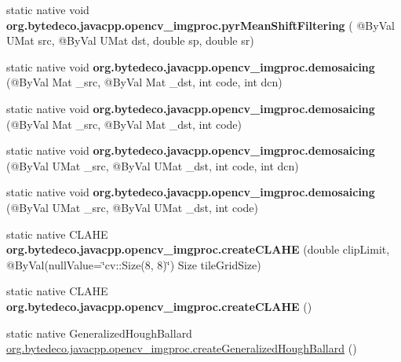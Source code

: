 \begin{DoxyCompactItemize}
\item 
\mbox{\label{group__imgproc__filter_ga8e24348e55b95d864865d7c1903e7555}} 
static native void {\bfseries org.\+bytedeco.\+javacpp.\+opencv\+\_\+imgproc.\+pyr\+Mean\+Shift\+Filtering} ( @By\+Val U\+Mat src, @By\+Val U\+Mat dst, double sp, double sr)
\item 
\mbox{\label{group__imgproc__filter_ga43b092e00aaf90fda456fb6613004018}} 
static native void {\bfseries org.\+bytedeco.\+javacpp.\+opencv\+\_\+imgproc.\+demosaicing} (@By\+Val Mat \+\_\+src, @By\+Val Mat \+\_\+dst, int code, int dcn)
\item 
\mbox{\label{group__imgproc__filter_ga50b3861706458e84ba09dc916db23498}} 
static native void {\bfseries org.\+bytedeco.\+javacpp.\+opencv\+\_\+imgproc.\+demosaicing} (@By\+Val Mat \+\_\+src, @By\+Val Mat \+\_\+dst, int code)
\item 
\mbox{\label{group__imgproc__filter_gac1393006c09ce6896767536b0c184d21}} 
static native void {\bfseries org.\+bytedeco.\+javacpp.\+opencv\+\_\+imgproc.\+demosaicing} (@By\+Val U\+Mat \+\_\+src, @By\+Val U\+Mat \+\_\+dst, int code, int dcn)
\item 
\mbox{\label{group__imgproc__filter_ga79a9d147081b0e7d93445844fadb8f7f}} 
static native void {\bfseries org.\+bytedeco.\+javacpp.\+opencv\+\_\+imgproc.\+demosaicing} (@By\+Val U\+Mat \+\_\+src, @By\+Val U\+Mat \+\_\+dst, int code)
\item 
\mbox{\label{group__imgproc__filter_ga27340c3d82734719ed4587b492128ce0}} 
static native C\+L\+A\+HE {\bfseries org.\+bytedeco.\+javacpp.\+opencv\+\_\+imgproc.\+create\+C\+L\+A\+HE} (double clip\+Limit, @By\+Val(null\+Value=\char`\"{}cv\+::\+Size(8, 8)\char`\"{}) Size tile\+Grid\+Size)
\item 
\mbox{\label{group__imgproc__filter_ga4c917bd1387042f801f75e5ebec325be}} 
static native C\+L\+A\+HE {\bfseries org.\+bytedeco.\+javacpp.\+opencv\+\_\+imgproc.\+create\+C\+L\+A\+HE} ()
\item 
static native Generalized\+Hough\+Ballard \hyperlink{group__imgproc__filter_ga9184647c04f254c7cfa32edf2cb43bec}{org.\+bytedeco.\+javacpp.\+opencv\+\_\+imgproc.\+create\+Generalized\+Hough\+Ballard} ()

\end{DoxyCompactItemize}
